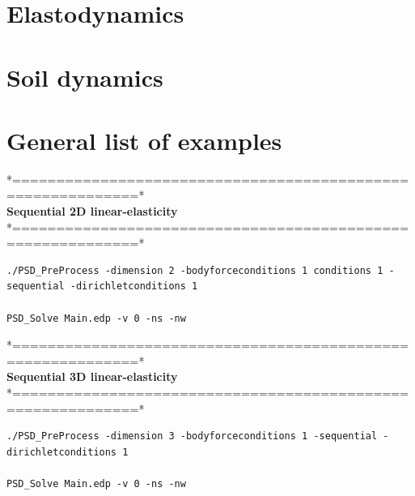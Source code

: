 \documentclass{report}
\begin{document}
\pagebreak

\section{Elastodynamics}
\pagebreak

\section{Soil dynamics}



\pagebreak

\section{General list of examples}
 *============================================================*\\
  \textbf{Sequential  2D linear-elasticity}\\                   
 *============================================================*\\
\begin{lstlisting}[style=Linux] 
./PSD_PreProcess -dimension 2 -bodyforceconditions 1 conditions 1 -sequential -dirichletconditions 1 
	
PSD_Solve Main.edp -v 0 -ns -nw 
\end{lstlisting}


*============================================================*\\
 \textbf{Sequential  3D linear-elasticity}                   \\
*============================================================*\\
\begin{lstlisting}[style=Linux] 
./PSD_PreProcess -dimension 3 -bodyforceconditions 1 -sequential -dirichletconditions 1

PSD_Solve Main.edp -v 0 -ns -nw
\end{lstlisting}
\end{document}
